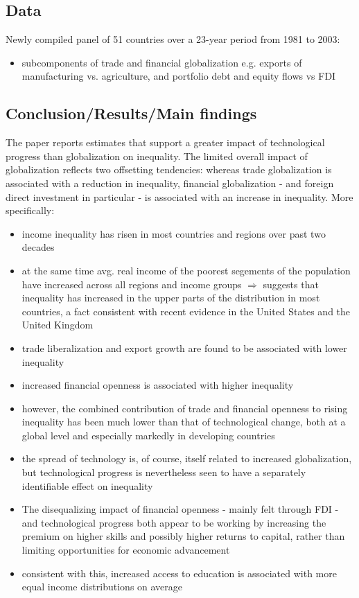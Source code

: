 \documentclass[a4paper,12pt]{scrartcl} %
\begin{document}
\subsection{Data}
Newly compiled panel of 51 countries over a 23-year period from 1981 to 2003:
\begin{itemize}
\item subcomponents of trade and financial globalization e.g. exports of manufacturing vs. agriculture, and portfolio debt and equity flows vs FDI
\end{itemize}
\subsection{Conclusion/Results/Main findings}
The paper reports estimates that support a greater impact of technological progress than globalization on inequality. The limited overall impact of globalization reflects two offsetting tendencies: whereas trade globalization is associated with a reduction in inequality, financial globalization - and foreign direct investment in particular - is associated with an
increase in inequality. More specifically:
\begin{itemize}
\item income inequality has risen in most countries and regions over past two decades
\item at the same time avg. real income of the poorest segements of the population have increased across all regions and income groups $\Rightarrow$ suggests that inequality has increased in the upper parts of the distribution in most countries, a fact consistent with recent evidence in the United States and the United Kingdom
\item trade liberalization and export growth are found to be associated with lower inequality
\item increased financial openness is associated with higher inequality
\item however, the combined contribution of trade and financial openness to rising inequality has been much lower than that of technological change, both at a global level and
especially markedly in developing countries
\item the spread of technology is, of course, itself related to increased globalization, but technological progress is nevertheless seen to have a separately identifiable effect on inequality
\item The disequalizing impact of financial openness - mainly felt through FDI - and technological progress both appear to be working by increasing the premium on higher skills and possibly higher returns to capital, rather than limiting opportunities for economic advancement
\item consistent with this, increased access to education is associated with more equal income distributions on average
\end{itemize}
\end{document}
